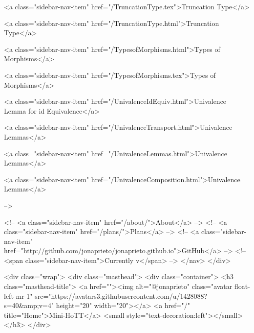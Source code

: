       
    
      
        
          <a class="sidebar-nav-item" href="/TruncationType.tex">Truncation Type</a>
        
      
    
      
        
          <a class="sidebar-nav-item" href="/TruncationType.html">Truncation Type</a>
        
      
    
      
        
          <a class="sidebar-nav-item" href="/TypesofMorphisms.html">Types of Morphisms</a>
        
      
    
      
        
          <a class="sidebar-nav-item" href="/TypesofMorphisms.tex">Types of Morphisms</a>
        
      
    
      
        
          <a class="sidebar-nav-item" href="/UnivalenceIdEquiv.html">Univalence Lemma for id Equivalence</a>
        
      
    
      
        
          <a class="sidebar-nav-item" href="/UnivalenceTransport.html">Univalence Lemmas</a>
        
      
    
      
        
          <a class="sidebar-nav-item" href="/UnivalenceLemmas.html">Univalence Lemmas</a>
        
      
    
      
        
          <a class="sidebar-nav-item" href="/UnivalenceComposition.html">Univalence Lemmas</a>
        
      
     -->

    <!-- <a class="sidebar-nav-item" href="/about/">About</a> -->
    <!-- <a class="sidebar-nav-item" href="/plans/">Plans</a> -->
    <!-- <a class="sidebar-nav-item" href="http://github.com/jonaprieto/jonaprieto.github.io">GitHub</a> -->
    <!-- <span class="sidebar-nav-item">Currently v</span> -->
  </nav>
</div>

    <div class="wrap">
      <div class="masthead">
        <div class="container">
          <h3 class="masthead-title">
            <a href=""><img alt="@jonaprieto" class="avatar float-left mr-1" src="https://avatars3.githubusercontent.com/u/1428088?s=40&amp;v=4" height="20" width="20"></a>
            <a href="/" title="Home">Mini-HoTT</a>
            <small style="text-decoration:left"></small>
          </h3>
        </div>
      
